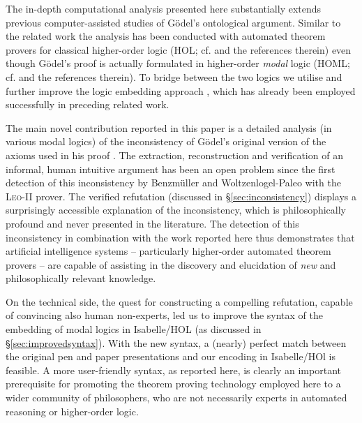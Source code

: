 \documentclass{article}
\begin{document}
The in-depth computational analysis presented here substantially
extends previous computer-assisted studies of G\"odel's ontological
argument. Similar to the related work \cite{J30,C40} the analysis has
been conducted with automated theorem provers for classical
higher-order logic (HOL; cf. \cite{andrewsSEP} and the references
therein) even though G\"odel's proof is actually formulated in
higher-order \emph{modal} logic (HOML; cf. \cite{homl} and the
references therein). To bridge between the two logics we utilise and
further improve the logic embedding approach \cite{J23,C40}, which has
already been employed successfully in preceding related work.

The main novel contribution reported in this paper is a detailed
analysis (in various modal logics) of the inconsistency of G\"{o}del's
original version of the axioms used in his proof
. The extraction, reconstruction and
verification of an informal, human intuitive argument has been an open
problem since the first detection of this inconsistency by
Benzm\"uller and Woltzenlogel-Paleo  with the
\textsc{Leo-II} prover.  The verified refutation (discussed in
\S\ref{sec:inconsistency}) displays a surprisingly accessible
explanation of the inconsistency, which is philosophically profound
and never presented in the literature. The detection of this
inconsistency in combination with the work reported here thus
demonstrates that artificial intelligence systems -- particularly
higher-order automated theorem provers -- are capable of assisting in
the discovery and elucidation of \emph{new} and philosophically
relevant knowledge.

On the technical side, the quest for constructing a compelling
refutation, capable of convincing also human non-experts, led us to
improve the syntax of the embedding of modal logics in Isabelle/HOL
(as discussed in \S\ref{sec:improvedsyntax}). With the new syntax, a
(nearly) perfect match between the original pen and paper
presentations and our encoding in Isabelle/HOl is feasible. A more
user-friendly syntax, as reported here, is clearly an important
prerequisite for promoting the theorem proving technology employed
here to a wider community of philosophers, who are not necessarily
experts in automated reasoning or higher-order logic.
\end{document}
